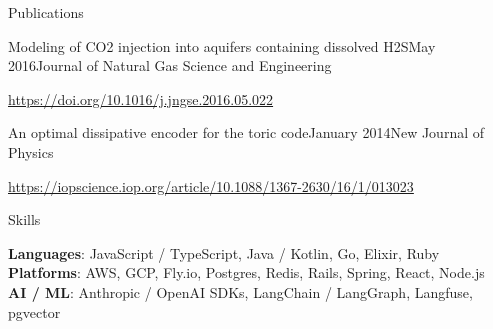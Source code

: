 \documentclass{resume} %
\begin{document}
\begin{rSection}{Publications}

\begin{rSubsection}{Modeling of CO2 injection into aquifers containing dissolved H2S}{May 2016}{Journal of Natural Gas Science and Engineering}{}
\item \href{https://doi.org/10.1016/j.jngse.2016.05.022}{https://doi.org/10.1016/j.jngse.2016.05.022}
\end{rSubsection}

\begin{rSubsection}{An optimal dissipative encoder for the toric code}{January 2014}{New Journal of Physics}{}
\item \href{https://iopscience.iop.org/article/10.1088/1367-2630/16/1/013023}{https://iopscience.iop.org/article/10.1088/1367-2630/16/1/013023}
\end{rSubsection}

\end{rSection}


\begin{rSection}{Skills}

\textbf{Languages}: JavaScript / TypeScript, Java / Kotlin, Go, Elixir, Ruby \\
\textbf{Platforms}: AWS, GCP, Fly.io, Postgres, Redis, Rails, Spring, React, Node.js \\
\textbf{AI / ML}: Anthropic / OpenAI SDKs, LangChain / LangGraph, Langfuse, pgvector

\end{rSection}





\end{document}
